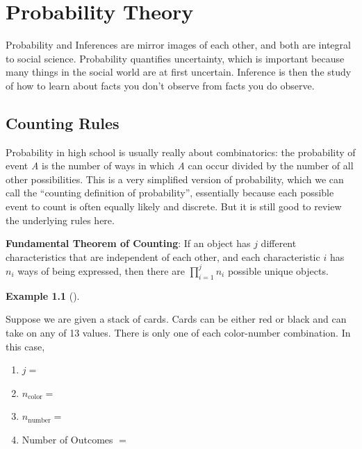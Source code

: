 \documentclass[
  letterpaper,
]{book}
\theoremstyle{definition}
\theoremstyle{definition}
\newtheorem{example}{Example}[chapter]
\theoremstyle{plain}
\theoremstyle{definition}
\theoremstyle{plain}
\theoremstyle{plain}
\theoremstyle{remark}
\begin{document}
\hypertarget{probability-theory}{%
\chapter{Probability Theory}\label{probability-theory}}

Probability and Inferences are mirror images of each other, and both are
integral to social science. Probability quantifies uncertainty, which is
important because many things in the social world are at first
uncertain. Inference is then the study of how to learn about facts you
don't observe from facts you do observe.

\hypertarget{counting-rules}{%
\section{Counting Rules}\label{counting-rules}}

Probability in high school is usually really about combinatorics: the
probability of event \emph{A} is the number of ways in which \emph{A}
can occur divided by the number of all other possibilities. This is a
very simplified version of probability, which we can call the ``counting
definition of probability'', essentially because each possible event to
count is often equally likely and discrete. But it is still good to
review the underlying rules here.

\textbf{Fundamental Theorem of Counting}: If an object has \(j\)
different characteristics that are independent of each other, and each
characteristic \(i\) has \(n_i\) ways of being expressed, then there are
\(\prod_{i = 1}^j n_i\) possible unique objects.

\leavevmode{}%
\begin{example}[]\label{exm-countingrules}

Suppose we are given a stack of cards. Cards can be either red or black
and can take on any of 13 values. There is only one of each color-number
combination. In this case,

\begin{enumerate}
\def\labelenumi{\arabic{enumi}.}
\item
  \(j =\)
\item
  \(n_{\text{color}} =\)
\item
  \(n_{\text{number}} =\)
\item
  Number of Outcomes \(=\)
\end{enumerate}

\end{example}
\end{document}
